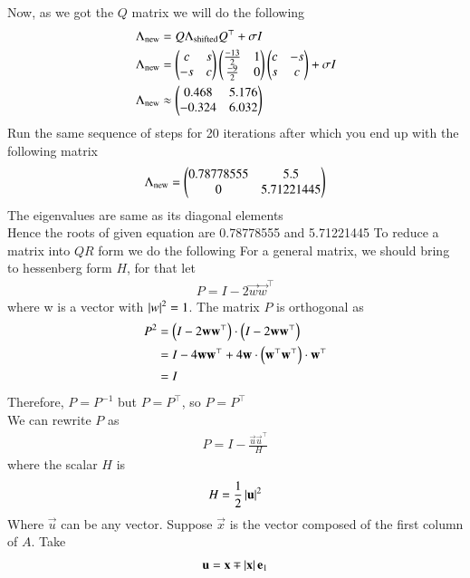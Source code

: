 \documentclass[journal]{IEEEtran}
\begin{document}
Now, as we got the $Q$ matrix we will do the following
\begin{align}
\Lambda_{\text{new}} &= Q\Lambda_{\text{shifted}}Q^\top + \sigma I\\
\Lambda_{\text{new}} &= \begin{pmatrix}c & s\\-s & c\end{pmatrix}\begin{pmatrix}\frac{-13}{2} & 1\\ \frac{-9}{2} & 0\end{pmatrix}\begin{pmatrix}c & -s\\s & c\end{pmatrix} + \sigma I\\
\Lambda_{\text{new}} &\approx \begin{pmatrix}0.468 & 5.176\\-0.324 & 6.032\end{pmatrix} 
\end{align}
Run the same sequence of steps for 20 iterations after which you end up with the following matrix
\begin{align}
    \Lambda_{\text{new}} = \begin{pmatrix}0.78778555 & 5.5\\ 0 & 5.71221445\end{pmatrix}
\end{align}
The eigenvalues are same as its diagonal elements\\
Hence the roots of given equation are 0.78778555 and 5.71221445\newline \newline
To reduce a matrix into $QR$ form we do the following\newline
For a general matrix, we should bring to hessenberg form $H$, for that let
\begin{align}
	P = I-2\vec{w}\vec{w}^\top
\end{align}
where w is a vector with $\left\vert w\right\vert^2=1$. The matrix $P$ is orthogonal as
\begin{align}
P^2 &=\left(I - 2\mathbf{w}\mathbf{w}^\top\right)\cdot\left(I - 2\mathbf{w}\mathbf{w}^\top\right)\\
    &=I-4\mathbf{w}\mathbf{w}^\top + 4\mathbf{w}\cdot\left(\mathbf{w}^\top\mathbf{w}^\top\right)\cdot\mathbf{w}^\top\\
    &=I
\end{align}
Therefore, $P=P^{-1}$ but $P = P^\top$, so $P = P^\top$ \\
We can rewrite $P$ as
\begin{align}
	P = I - \frac{\vec{u}\vec{u}^\top}{H}
\end{align}
where the scalar $H$ is
\begin{align}
H = \frac{1}{2}\left\vert\mathbf{u}\right\vert^2
\end{align}
Where $\vec{u}$ can be any vector. Suppose $\vec{x}$ is the vector composed of the first column of $A$. Take
\begin{align}
	\mathbf{u} = \mathbf{x} \mp \left\vert\mathbf{x}\right\vert\mathbf{e}_1
\end{align}
\end{document}
